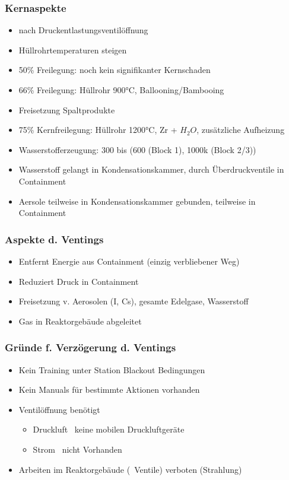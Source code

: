 \documentclass[12pt]{article}
\begin{document}
\subsubsection{Kernaspekte}
\begin{itemize}
  \item nach Druckentlastungsventilöffnung
  \item Hüllrohrtemperaturen steigen
  \item 50\% Freilegung: noch kein signifikanter Kernschaden
  \item 66\% Freilegung: Hüllrohr 900°C, Ballooning/Bambooing
  \item Freisetzung Spaltprodukte
  \item 75\% Kernfreilegung: Hüllrohr 1200°C, Zr + \(H_2O\), zusätzliche Aufheizung
  \item Wasserstofferzeugung: 300 bis (600 (Block 1), 1000k (Block 2/3))
  \item Wasserstoff gelangt in Kondensationskammer, durch Überdruckventile in Containment
  \item Aersole teilweise in Kondensationskammer gebunden, teilweise in Containment
\end{itemize}

\subsubsection{Aspekte d. Ventings}
\begin{itemize}
  \item Entfernt Energie aus Containment (einzig verbliebener Weg)
  \item Reduziert Druck in Containment
  \item Freisetzung v. Aerosolen (I, Cs), gesamte Edelgase, Wasserstoff
  \item Gas in Reaktorgebäude abgeleitet
\end{itemize}

\subsubsection{Gründe f. Verzögerung d. Ventings}
\begin{itemize}
  \item Kein Training unter Station Blackout Bedingungen
  \item Kein Manuals für bestimmte Aktionen vorhanden
  \item Ventilöffnung benötigt
  \begin{itemize}
    \item Druckluft \textrightarrow\ keine mobilen Druckluftgeräte
    \item Strom \textrightarrow\ nicht Vorhanden
  \end{itemize}
  \item Arbeiten im Reaktorgebäude (\textrightarrow\ Ventile) verboten (Strahlung)
\end{itemize}
\end{document}
